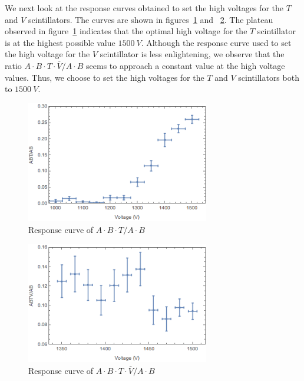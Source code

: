 \documentclass[aps, reprint,amsmath,amssymb]{revtex4-1} %
\begin{document}
We next look at the response curves obtained to set the high voltages for the $T$ and $V$ scintillators. The curves are shown in figures~\ref{fig:ABT} and ~\ref{fig:ABTV}. The plateau observed in figure~\ref{fig:ABT} indicates that the optimal high voltage for the $T$ scintillator is at the highest possible value $\SI{1500}{V}$. Although the response curve used to set the high voltage for the $V$ scintillator is less enlightening, we observe that the ratio $A\cdot B\cdot T \cdot \overline{V}/ A\cdot B$ seems to approach a constant value at the high voltage values. Thus, we choose to set the high voltages for the $T$ and $V$ scintillators both to $\SI{1500}{V}$.

\begin{figure}
\centering
\includegraphics[width=8cm]{ABT.png}
\caption{Response curve of $A\cdot B\cdot T/ A\cdot B$}
\label{fig:ABT}
\end{figure}
\begin{figure}
\centering
\includegraphics[width=8cm]{ABTV.png}
\caption{Response curve of $A\cdot B\cdot T \cdot \overline{V}/ A\cdot B$}
\label{fig:ABTV}
\end{figure}
\end{document}
